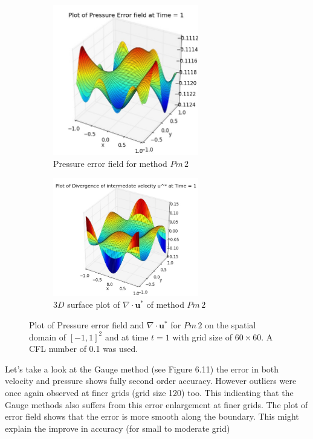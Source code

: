 \begin{figure}[H]
	\centering
	\begin{subfigure}[t]{2.5in}
		\centering
		\includegraphics[width=2.5in]{figures/Pm2_pf2_P_error_t_1_grid_60.jpg}
		\caption{Pressure error field for method $Pm\,2$}\label{fig:6.10a}		
	\end{subfigure}
	\quad
	\begin{subfigure}[t]{2.5in}
		\centering
		\includegraphics[width=2.5in]{figures/Pm2_pf2_div_uvstar_t_1_grid_60.jpg}
		\caption{$3D$ surface plot of $\nabla \cdot \textbf{u}^*$ of method $Pm\,2$}\label{fig:6.10b}
	\end{subfigure}
	\caption{Plot of Pressure error field and $\nabla \cdot \textbf{u}^*$ for $Pm\,2$ on the spatial domain of $[-1,1]^2$ and at time $t=1$ with grid size of $60 \times 60$. A CFL number of 0.1 was used.}\label{fig:6.10}
\end{figure}

Let's take a look at the Gauge method (see Figure 6.11) the error in both velocity and pressure shows fully second order accuracy. However outliers were once again observed at finer grids (grid size 120) too. This indicating that the Gauge methods also suffers from this error enlargement at finer grids. The plot of error field shows that the error is more smooth along the boundary. This might explain the improve in accuracy (for small to moderate grid)

